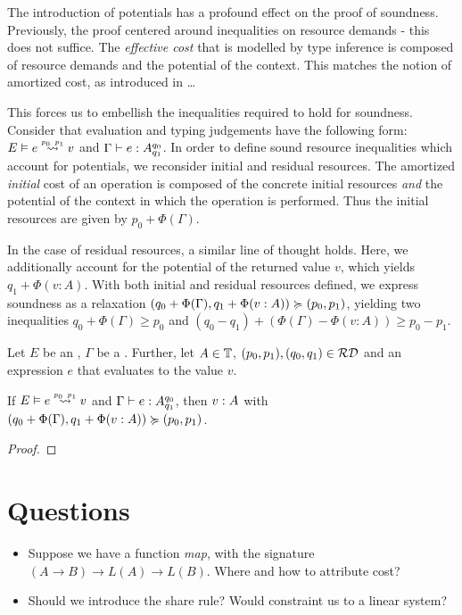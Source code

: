 The introduction of potentials has a profound effect on the proof of soundness. Previously, the proof centered around inequalities on resource demands - this does not suffice. The \emph{effective cost} that is modelled by type inference is composed of resource demands and the potential of the context. This matches the notion of amortized cost, as introduced in \dots
{}

This forces us to embellish the inequalities required to hold for soundness. Consider that evaluation and typing judgements have the following form:  \(\evals{E}{e}{v}{p_0}{p_1}\) and \(\Gamma \vdash e : A ^{q_0}_{q_1}\). In order to define sound resource inequalities which account for potentials, we reconsider initial and residual resources. The amortized \emph{initial} cost of an operation is composed of the concrete initial resources \emph{and} the potential of the context in which the operation is performed. Thus the initial resources are given by \(p_0 + \Phi(\Gamma)\). 

In the case of residual resources, a similar line of thought holds. Here, we additionally account for the potential of the returned value \(v\), which yields \(q_1 + \Phi(v : A)\). With both initial and residual resources defined, we express soundness as a relaxation \((q_0 + \Phi(\Gamma), q_1 + \Phi(v : A)) \succcurlyeq (p_0, p_1)\), yielding two inequalities \(q_0 + \Phi(\Gamma) \geq p_0\) and \((q_0 - q_1) + (\Phi(\Gamma) - \Phi(v : A)) \geq p_0 - p_1\).

\begin{theorem}\label{thm:soundness-5}
   Let \(E\) be an , \(\Gamma\) be a . Further, let \(A \in \mathbb{T}\), \((p_0, p_1), (q_0, q_1) \in \mathcal{RD}\) and an expression \(e\) that evaluates to the value \(v\). 

   \begin{center}
   If \(\evals{E}{e}{v}{p_0}{p_1}\) and \(\Gamma \vdash e : A ^{q_0}_{q_1}\), then \(v : A ^{}_{}\) with \((q_0 + \Phi(\Gamma), q_1 + \Phi(v : A)) \succcurlyeq (p_0, p_1)\).
   \end{center}
\end{theorem}

\begin{proof}
\end{proof}

\section{Questions}

\begin{itemize}
   \item Suppose we have a function \emph{map}, with the signature \((A \to B) \to L(A) \to L(B)\). Where and how to attribute cost?
   \item Should we introduce the share rule? Would constraint us to a linear system?
\end{itemize}

